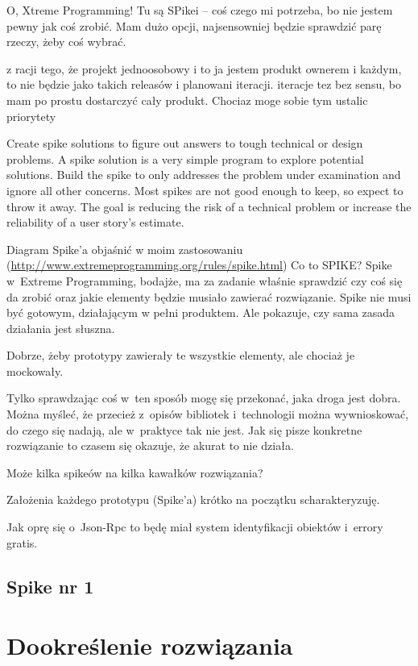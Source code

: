 O, Xtreme Programming! Tu są SPikei -- coś czego mi potrzeba, bo nie jestem pewny jak coś zrobić. Mam dużo opcji, najsensowniej będzie sprawdzić parę rzeczy, żeby coś wybrać.

z racji tego, że projekt jednoosobowy i to ja jestem produkt ownerem i każdym, to nie będzie jako takich releasów i planowani iteracji. iteracje tez bez sensu, bo mam po prostu dostarczyć cały produkt. Chociaz moge sobie tym ustalic priorytety

Create spike solutions to figure out answers to tough technical or design problems. A spike solution is a very simple program to explore potential solutions. Build the spike to only addresses the problem under examination and ignore all other concerns. Most spikes are not good enough to keep, so expect to throw it away. The goal is reducing the risk of a technical problem or increase the reliability of a user story's estimate.

Diagram Spike'a objaśnić w moim zastosowaniu (\url{http://www.extremeprogramming.org/rules/spike.html})
Co to SPIKE? Spike w~Extreme Programming, bodajże, ma za zadanie właśnie sprawdzić czy coś się da zrobić oraz jakie elementy będzie musiało zawierać rozwiązanie.
Spike nie musi być gotowym, działającym w pełni produktem. Ale pokazuje, czy sama zasada działania jest słuszna.


Dobrze, żeby prototypy zawierały te wszystkie elementy, ale chociaż je mockowały.

Tylko sprawdzając coś w~ten sposób mogę się przekonać, jaka droga jest dobra. Można myśleć, że przecież z~opisów bibliotek i~technologii można wywnioskować, do czego się nadają, ale w~praktyce tak nie jest. Jak się pisze konkretne rozwiązanie to czasem się okazuje, że akurat to nie działa.


Może kilka spikeów na kilka kawałków rozwiązania?

Założenia każdego prototypu (Spike'a) krótko na początku scharakteryzuję.

Jak oprę się o~Json-Rpc to będę miał system identyfikacji obiektów i~errory gratis.

\subsection{Spike nr 1}







\section{Dookreślenie rozwiązania}
